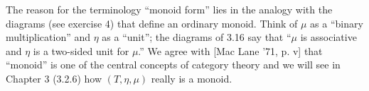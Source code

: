 The reason for the terminology “monoid form” lies in the analogy with the diagrams (see exercise 4) that define an ordinary monoid. Think of $\mu$ as a “binary multiplication” and $\eta$ as a “unit”; the diagrams of 3.16 say that “$\mu$ is associative and $\eta$ is a two-sided unit for $\mu$.” We agree with [Mac Lane '71, p. v] that “monoid” is one of the central concepts of category theory and we will see in Chapter 3 (3.2.6) how $(T, \eta, \mu)$ really is a monoid.